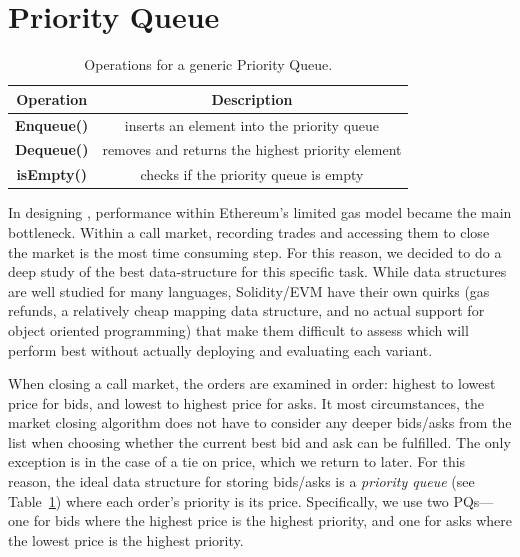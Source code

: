 
\section{Priority Queue}\label{sec:pq}

\begin{table}[t]
\centering
\begin{tabular}{|c|c|}
\hline

\textbf{Operation}   & \textbf{Description}    \\ \hline

	\textbf{Enqueue()}       	& inserts an element into the priority queue                        \\ \hline
	\textbf{Dequeue()}		& removes and returns the highest priority element 		\\ \hline
	\textbf{isEmpty()}			& checks if the priority queue is empty 					\\ \hline

\end{tabular}
\caption{\footnotesize{Operations for a generic Priority Queue.}
\label{tab:PQ_API}}
\end{table}

In designing \cm, performance within Ethereum's limited gas model became the main bottleneck. Within a call market, recording trades and accessing them to close the market is the most time consuming step. For this reason, we decided to do a deep study of the best data-structure for this specific task. While data structures are well studied for many languages, Solidity/EVM have their own quirks (\eg gas refunds, a relatively cheap mapping data structure, and no actual support for object oriented programming) that make them difficult to assess which will perform best without actually deploying and evaluating each variant. 

When closing a call market, the orders are examined in order: highest to lowest price for bids, and lowest to highest price for asks. It most circumstances, the market closing algorithm does not have to consider any deeper bids/asks from the list when choosing whether the current best bid and ask can be fulfilled. The only exception is in the case of a tie on price, which we return to later. For this reason, the ideal data structure for storing bids/asks is a \textit{priority queue} (see Table~\ref{tab:PQ_API}) where each order's priority is its price. Specifically, we use two PQs---one for bids where the highest price is the highest priority, and one for asks where the lowest price is the highest priority. 

